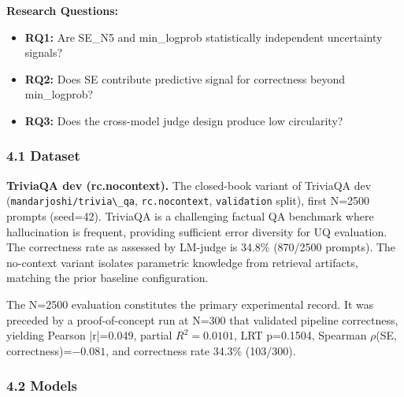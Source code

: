 
\textbf{Research Questions:}

\begin{itemize}
\item \textbf{RQ1:} Are SE\_N5 and min\_logprob statistically independent uncertainty signals?
\item \textbf{RQ2:} Does SE contribute predictive signal for correctness beyond min\_logprob?
\item \textbf{RQ3:} Does the cross-model judge design produce low circularity?
\end{itemize}

\subsubsection{4.1 Dataset}

\textbf{TriviaQA dev (rc.nocontext).} The closed-book variant of TriviaQA dev (\texttt{mandarjoshi/trivia\textbackslash \_qa}, \texttt{rc.nocontext}, \texttt{validation} split), first N=2500 prompts (seed=42). TriviaQA is a challenging factual QA benchmark where hallucination is frequent, providing sufficient error diversity for UQ evaluation. The correctness rate as assessed by LM-judge is 34.8\% (870/2500 prompts). The no-context variant isolates parametric knowledge from retrieval artifacts, matching the prior baseline configuration.

The N=2500 evaluation constitutes the primary experimental record. It was preceded by a proof-of-concept run at N=300 that validated pipeline correctness, yielding Pearson |r|=0.049, partial $R^{2}=0.0101$, LRT p=0.1504, Spearman $\rho$(SE, correctness)=$-0.081$, and correctness rate 34.3\% (103/300).

\begin{table}[htbp]
\centering
{}
\end{table}

\subsubsection{4.2 Models}

